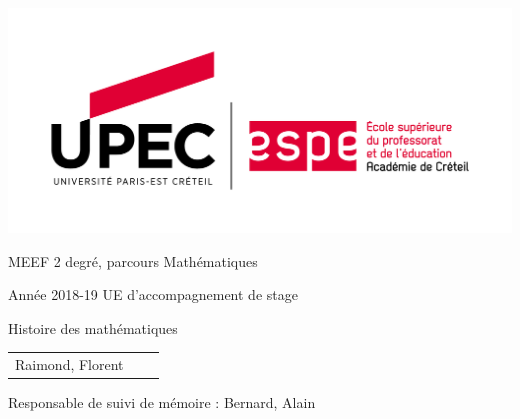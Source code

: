 \begin{titlepage}
    \begin{center}
        \includegraphics[scale=0.5]{logo_UPEC_ESPE.png}

        MEEF 2 degré, parcours Mathématiques

        Année 2018-19 UE d'accompagnement de stage

        \vspace*{\fill}

        \Huge{Histoire des mathématiques}

        \vspace*{\fill}

        \begin{tabular}{ccc}
            \Large{Raimond, Florent}
        \end{tabular}

        \vspace*{\fill}

        \Large{Responsable de suivi de mémoire : Bernard, Alain}

        \vspace*{\fill}
    \end{center}
\end{titlepage}

